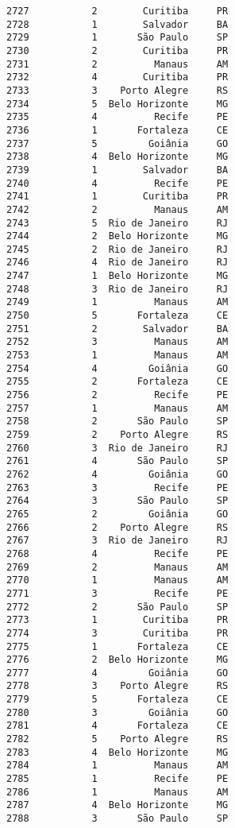 \documentclass[11pt]{article}
\begin{document}
\begin{Verbatim}[commandchars=\\\{\}]
2727           2        Curitiba     PR  
2728           1        Salvador     BA  
2729           1       São Paulo     SP  
2730           2        Curitiba     PR  
2731           2          Manaus     AM  
2732           4        Curitiba     PR  
2733           3    Porto Alegre     RS  
2734           5  Belo Horizonte     MG  
2735           4          Recife     PE  
2736           1       Fortaleza     CE  
2737           5         Goiânia     GO  
2738           4  Belo Horizonte     MG  
2739           1        Salvador     BA  
2740           4          Recife     PE  
2741           1        Curitiba     PR  
2742           2          Manaus     AM  
2743           5  Rio de Janeiro     RJ  
2744           2  Belo Horizonte     MG  
2745           2  Rio de Janeiro     RJ  
2746           4  Rio de Janeiro     RJ  
2747           1  Belo Horizonte     MG  
2748           3  Rio de Janeiro     RJ  
2749           1          Manaus     AM  
2750           5       Fortaleza     CE  
2751           2        Salvador     BA  
2752           3          Manaus     AM  
2753           1          Manaus     AM  
2754           4         Goiânia     GO  
2755           2       Fortaleza     CE  
2756           2          Recife     PE  
2757           1          Manaus     AM  
2758           2       São Paulo     SP  
2759           2    Porto Alegre     RS  
2760           3  Rio de Janeiro     RJ  
2761           4       São Paulo     SP  
2762           4         Goiânia     GO  
2763           3          Recife     PE  
2764           3       São Paulo     SP  
2765           2         Goiânia     GO  
2766           2    Porto Alegre     RS  
2767           3  Rio de Janeiro     RJ  
2768           4          Recife     PE  
2769           2          Manaus     AM  
2770           1          Manaus     AM  
2771           3          Recife     PE  
2772           2       São Paulo     SP  
2773           1        Curitiba     PR  
2774           3        Curitiba     PR  
2775           1       Fortaleza     CE  
2776           2  Belo Horizonte     MG  
2777           4         Goiânia     GO  
2778           3    Porto Alegre     RS  
2779           5       Fortaleza     CE  
2780           3         Goiânia     GO  
2781           4       Fortaleza     CE  
2782           5    Porto Alegre     RS  
2783           4  Belo Horizonte     MG  
2784           1          Manaus     AM  
2785           1          Recife     PE  
2786           1          Manaus     AM  
2787           4  Belo Horizonte     MG  
2788           3       São Paulo     SP  

\end{Verbatim}
\end{document}
